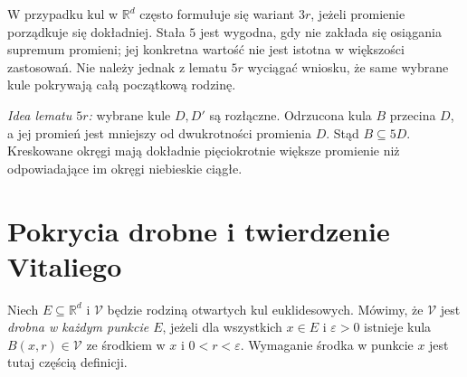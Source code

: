 \begin{uwaga}
W przypadku kul w $\mathbb R^d$ często formułuje się wariant
$3r$, jeżeli promienie porządkuje się dokładniej. Stała $5$
jest wygodna, gdy nie zakłada się osiągania supremum promieni;
jej konkretna wartość nie jest istotna w większości zastosowań.
Nie należy jednak z lematu $5r$ wyciągać wniosku, że same
wybrane kule pokrywają całą początkową rodzinę.
\end{uwaga}

\begin{center}
\end{center}
\noindent\textit{Idea lematu $5r$:} wybrane kule $D,D'$
są rozłączne. Odrzucona kula $B$ przecina $D$, a jej
promień jest mniejszy od dwukrotności promienia $D$.
Stąd $B\subseteq5D$. Kreskowane okręgi mają dokładnie
pięciokrotnie większe promienie niż odpowiadające im
okręgi niebieskie ciągłe.

\section{Pokrycia drobne i twierdzenie Vitaliego}
\begin{definicja}
\label{def:vitali-fine-24}
Niech $E\subseteq\mathbb R^d$ i $\mathcal V$ będzie rodziną
otwartych kul euklidesowych. Mówimy, że $\mathcal V$ jest
\emph{drobna w każdym punkcie $E$}, jeżeli dla wszystkich
$x\in E$ i $\varepsilon>0$ istnieje kula
$B(x,r)\in\mathcal V$ ze środkiem w $x$ i $0<r<\varepsilon$.
Wymaganie środka w punkcie $x$ jest tutaj częścią definicji.
\end{definicja}


